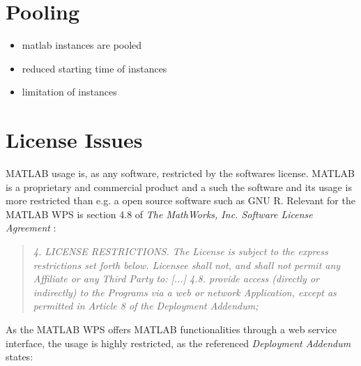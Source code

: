 	\section{Pooling}
	\begin{itemize}
		\item matlab instances are pooled
		\item reduced starting time of instances
		\item limitation of instances
	\end{itemize}
	\section{License Issues}
		MATLAB usage is, as any software, restricted by the softwares license. MATLAB is a proprietary and commercial product and a such the software and its usage is more restricted than e.g. a open source software such as GNU R. Relevant for the MATLAB WPS is section 4.8 of \emph{The MathWorks, Inc. Software License Agreement} \citep{matlablicense}:
		\begin{quote}\itshape\small
			4. LICENSE RESTRICTIONS.  The License is subject to the express restrictions
			set forth below. Licensee shall not, and shall not permit any Affiliate or any
			Third Party to:
				[...]
				4.8. provide access (directly or indirectly) to the Programs via a web or
				network Application, except as permitted in Article 8 of the Deployment
				Addendum;
		\end{quote}

		As the MATLAB WPS offers MATLAB functionalities through a web service interface, the usage is highly restricted, as the referenced \emph{Deployment Addendum} \citep{matlablicense} states:

